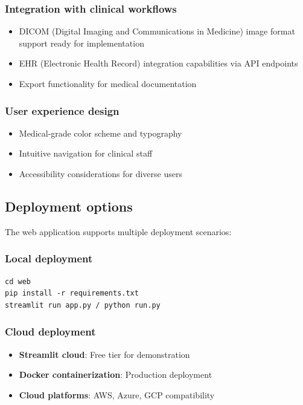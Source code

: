 \documentclass[11pt]{article}
\begin{document}
\subsubsection{Integration with clinical workflows}
\begin{itemize}
    \item DICOM (Digital Imaging and Communications in Medicine) image format support ready for implementation
    \item EHR (Electronic Health Record) integration capabilities via API endpoints
    \item Export functionality for medical documentation
\end{itemize}

\subsubsection{User experience design}
\begin{itemize}
    \item Medical-grade color scheme and typography
    \item Intuitive navigation for clinical staff
    \item Accessibility considerations for diverse users
\end{itemize}

\subsection{Deployment options}

The web application supports multiple deployment scenarios:

\subsubsection{Local deployment}
\begin{verbatim}
cd web
pip install -r requirements.txt
streamlit run app.py / python run.py
\end{verbatim}

\subsubsection{Cloud deployment}
\begin{itemize}
    \item \textbf{Streamlit cloud}: Free tier for demonstration
    \item \textbf{Docker containerization}: Production deployment
    \item \textbf{Cloud platforms}: AWS, Azure, GCP compatibility
\end{itemize}
\end{document}
